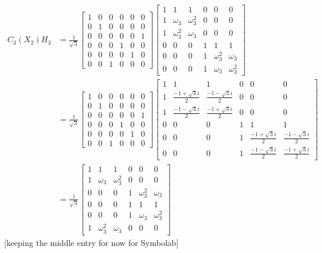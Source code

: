 \begin{align*}
C_3(X_2)H_3 &=
\frac{1}{\sqrt{3}}
\begin{bmatrix}
	1&0&0&0&0&0\\
	0&1&0&0&0&0\\ 
	0&0&0&0&0&1\\ 
	0&0&0&1&0&0\\ 
	0&0&0&0&1&0\\ 
	0&0&1&0&0&0
\end{bmatrix}
\begin{bmatrix}
	1&1&1&0&0&0\\ 
	1&\omega_3&\omega_3^2&0&0&0\\ 
	1&\omega_3^2&\omega_3&0&0&0\\ 
	0&0&0&1&1&1\\ 
	0&0&0&1&\omega_3^2&\omega_3\\ 
	0&0&0&1&\omega_3&\omega_3^2
\end{bmatrix}
\\&=
\frac{1}{\sqrt{3}}
\begin{bmatrix}
	1&0&0&0&0&0\\
	0&1&0&0&0&0\\ 
	0&0&0&0&0&1\\ 
	0&0&0&1&0&0\\ 
	0&0&0&0&1&0\\ 
	0&0&1&0&0&0
\end{bmatrix}
\begin{bmatrix}
	1&1&1&0&0&0\\ 
	1&\frac{-1 +\sqrt{3}i}{2}&\frac{-1 -\sqrt{3}i}{2}&0&0&0\\ 
	1&\frac{-1 -\sqrt{3}i}{2}&\frac{-1 +\sqrt{3}i}{2}&0&0&0\\ 
	0&0&0&1&1&1\\ 
	0&0&0&1&\frac{-1 +\sqrt{3}i}{2}&\frac{-1 -\sqrt{3}i}{2}\\ 
	0&0&0&1&\frac{-1 -\sqrt{3}i}{2}&\frac{-1 +\sqrt{3}i}{2}
\end{bmatrix}
\\&=
\frac{1}{\sqrt{3}}
\begin{bmatrix}
1&1&1&0&0&0\\ 
1&\omega_3&\omega_3^2&0&0&0\\
0&0&0&1&\omega_3^2&\omega_3\\ 
0&0&0&1&1&1\\ 
0&0&0&1&\omega_3&\omega_3^2\\
1&\omega_3^2&\omega_3&0&0&0
\end{bmatrix}
\end{align*}
[keeping the middle entry for now for Symbolab]


